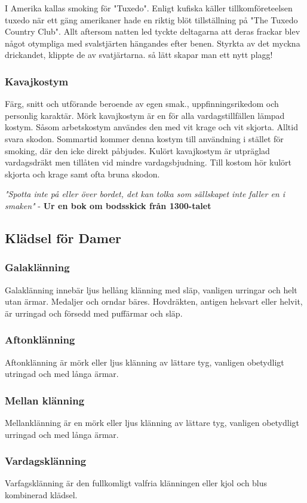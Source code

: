     I Amerika kallas smoking för "Tuxedo". Enligt kufiska käller tillkomföreteelsen tuxedo när ett gäng amerikaner hade en riktig blöt tillställning på "The Tuxedo Country Club". Allt aftersom natten led tyckte deltagarna att deras frackar blev något otympliga med svalstjärten hängandes efter benen. Styrkta av det myckna drickandet, klippte de av svatjärtarna. så lätt skapar man ett nytt plagg!

    \subsubsection{\textbf{Kavajkostym}}

    Färg, snitt och utförande beroende av egen smak., uppfinningsrikedom och personlig karaktär. Mörk kavajkostym är en för alla vardagstillfällen lämpad kostym. Såsom arbetskostym användes den med vit krage och vit skjorta. Alltid svara skodon. Sommartid kommer denna kostym till användning i stället för smoking, där den icke direkt påbjudes. Kulört kavajkostym är utpräglad vardagsdräkt men tillåten vid mindre vardagsbjudning. Till kostom hör kulört skjorta och krage samt ofta bruna skodon.

    \textit{"Spotta inte på eller över bordet, det kan tolka som sällskapet inte faller en i smaken"} - \textbf{Ur en bok om bodsskick från 1300-talet}

    \subsection{\textbf{Klädsel för Damer}}
    \subsubsection{\textbf{Galaklänning}}
    Galaklänning innebär ljus hellång klänning med släp, vanligen urringar och helt utan ärmar. Medaljer och orndar bäres. Hovdräkten, antigen helsvart eller helvit, är urringad och försedd med puffärmar och släp.

    \subsubsection{\textbf{Aftonklänning}}
    Aftonklänning är mörk eller ljus klänning av lättare tyg, vanligen obetydligt utringad och med långa ärmar.

    \subsubsection{\textbf{Mellan klänning}}
    Mellanklänning är en mörk eller ljus klänning av lättare tyg, vanligen obetydligt urringad och med långa ärmar.

    \subsubsection{\textbf{Vardagsklänning}}
    Varfagsklänning är den fullkomligt valfria klänningen eller kjol och blus kombinerad klädsel.
    

    
    

    \newpage
